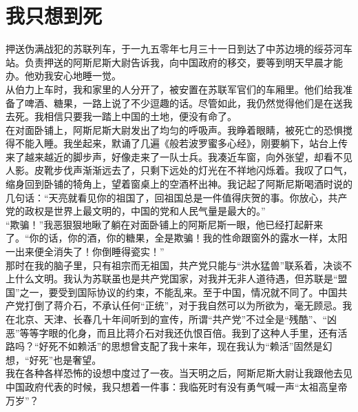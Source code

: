 \fancyhead[RO]{} %
\fancyhead[LE]{} %
\chapter*{我只想到死}
\thispagestyle{empty}
押送伪满战犯的苏联列车，于一九五零年七月三十一日到达了中苏边境的绥芬河车站。负责押送的阿斯尼斯大尉告诉我，向中国政府的移交，要等到明天早晨才能办。他劝我安心地睡一觉。\\

从伯力上车时，我和家里的人分开了，被安置在苏联军官们的车厢里。他们给我准备了啤酒、糖果，一路上说了不少逗趣的话。尽管如此，我仍然觉得他们是在送我去死。我相信只要我一踏上中国的土地，便没有命了。\\

在对面卧铺上，阿斯尼斯大尉发出了均匀的呼吸声。我睁着眼睛，被死亡的恐惧搅得不能入睡。我坐起来，默诵了几遍《般若波罗蜜多心经》，刚要躺下，站台上传来了越来越近的脚步声，好像走来了一队士兵。我凑近车窗，向外张望，却看不见人影。皮靴步伐声渐渐远去了，只剩下远处的灯光在不祥地闪烁着。我叹了口气，缩身回到卧铺的犄角上，望着窗桌上的空酒杯出神。我记起了阿斯尼斯喝酒时说的几句话：“天亮就看见你的祖国了，回祖国总是一件值得庆贺的事。你放心，共产党的政权是世界上最文明的，中国的党和人民气量是最大的。”\\

“欺骗！”我恶狠狠地瞅了躺在对面卧铺上的阿斯尼斯一眼，他已经打起鼾来了。“你的话，你的酒，你的糖果，全是欺骗！我的性命跟窗外的露水一样，太阳一出来便全消失了！你倒睡得瓷实！”\\

那时在我的脑子里，只有祖宗而无祖国，共产党只能与“洪水猛兽”联系着，决谈不上什么文明。我认为苏联虽也是共产党国家，对我并无非人道待遇，但苏联是“盟国”之一，要受到国际协议的约束，不能乱来。至于中国，情况就不同了。中国共产党打倒了蒋介石，不承认任何“正统”，对于我自然可以为所欲为，毫无顾忌。我在北京、天津、长春几十年间听到的宣传，所谓“共产党”不过全是“残酷”、“凶恶”等等字眼的化身，而且比蒋介石对我还仇恨百倍。我到了这种人手里，还有活路吗？“好死不如赖活”的思想曾支配了我十来年，现在我认为“赖活”固然是幻想，“好死”也是奢望。\\

我在各种各样恐怖的设想中度过了一夜。当天明之后，阿斯尼斯大尉让我跟他去见中国政府代表的时候，我只想着一件事：我临死时有没有勇气喊一声“太祖高皇帝万岁”？\\

